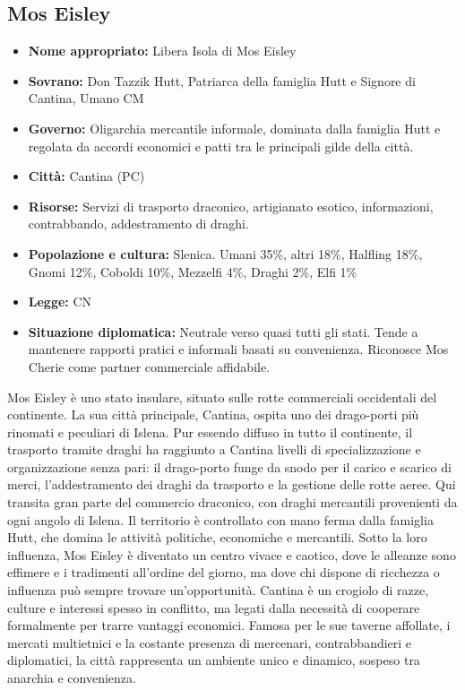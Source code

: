 \documentclass[10pt, a4paper]{report}
\begin{document}
\begin{multicols}{2}
	
\subsection*{Mos Eisley}
\begin{itemize}
	\item \textbf{Nome appropriato:} Libera Isola di Mos Eisley
	\item \textbf{Sovrano:} Don Tazzik Hutt, Patriarca della famiglia Hutt e Signore di Cantina, Umano CM
	\item \textbf{Governo:} Oligarchia mercantile informale, dominata dalla famiglia Hutt e regolata da accordi economici e patti tra le principali gilde della città.
	\item \textbf{Città:} Cantina (PC)
	\item \textbf{Risorse:} Servizi di trasporto draconico, artigianato esotico, informazioni, contrabbando, addestramento di draghi.
	\item \textbf{Popolazione e cultura:} Slenica. Umani 35\%, altri 18\%, Halfling 18\%, Gnomi 12\%, Coboldi 10\%, Mezzelfi 4\%, Draghi 2\%, Elfi 1\% 
	\item \textbf{Legge:} CN
	\item \textbf{Situazione diplomatica:} Neutrale verso quasi tutti gli stati. Tende a mantenere rapporti pratici e informali basati su convenienza. Riconosce Mos Cherie come partner commerciale affidabile.
\end{itemize}
Mos Eisley è uno stato insulare, situato sulle rotte commerciali occidentali del continente. La sua città principale, Cantina, ospita uno dei drago-porti più rinomati e peculiari di Islena. Pur essendo diffuso in tutto il continente, il trasporto tramite draghi ha raggiunto a Cantina livelli di specializzazione e organizzazione senza pari: il drago-porto funge da snodo per il carico e scarico di merci, l’addestramento dei draghi da trasporto e la gestione delle rotte aeree. Qui transita gran parte del commercio draconico, con draghi mercantili provenienti da ogni angolo di Islena.
Il territorio è controllato con mano ferma dalla famiglia Hutt, che domina le attività politiche, economiche e mercantili. Sotto la loro influenza, Mos Eisley è diventato un centro vivace e caotico, dove le alleanze sono effimere e i tradimenti all’ordine del giorno, ma dove chi dispone di ricchezza o influenza può sempre trovare un’opportunità.
Cantina è un crogiolo di razze, culture e interessi spesso in conflitto, ma legati dalla necessità di cooperare formalmente per trarre vantaggi economici. Famosa per le sue taverne affollate, i mercati multietnici e la costante presenza di mercenari, contrabbandieri e diplomatici, la città rappresenta un ambiente unico e dinamico, sospeso tra anarchia e convenienza.


\end{multicols}
\end{document}
